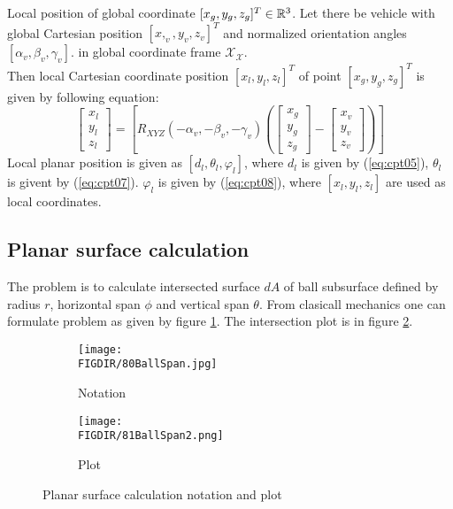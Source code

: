 \begin{definition}{Local position of global coordinate $[x_g,y_g,z_g]^T\in\mathbb{R}^3$.}\label{def:globalToLocal}
    Let there be vehicle with global Cartesian position $[x,_v,y_v,z_v]^T$ and normalized orientation angles $[\alpha_v,\beta_v,\gamma_v]$. in global coordinate frame $\mathscr{X}_\mathscr{X}$.\\
    Then local Cartesian coordinate position $[x_l,y_l,z_l]^T$ of point $[x_g,y_g,z_g]^T$ is given by following equation:
    \begin{equation}
        \begin{bmatrix}
            x_l\\y_l\\z_l
        \end{bmatrix}
        =
        \left [
            R_{XYZ}(-\alpha_v,-\beta_v,-\gamma_v)
            \left (
            \begin{bmatrix}
                x_g\\y_g\\z_g
            \end{bmatrix}
            -
            \begin{bmatrix}
                x_v\\y_v\\z_v
            \end{bmatrix}
            \right )
        \right ]
    \end{equation}
    Local planar position is given as $[d_l, \theta_l,\varphi_l]$, where $d_l$ is given by (\ref{eq:cpt05}), $\theta_l$ is givent by (\ref{eq:cpt07}). $\varphi_l$ is given by (\ref{eq:cpt08}), where $[x_l,y_l,z_l]$ are used as local coordinates.
\end{definition}

\subsection{Planar surface calculation}
\noindent The problem is to calculate intersected surface $dA$ of ball subsurface defined by radius $r$, horizontal span $\phi$ and vertical span $\theta$. From clasicall mechanics one can formulate problem as given by figure \ref{fig:80BallSpan}. The intersection plot is in figure \ref{fig:81BallSpan2}.
\begin{figure}[H]
    \centering
    \begin{subfigure}[H]{0.3\textwidth}
        \texttt{[image: \\FIGDIR/80BallSpan.jpg]}
        \caption{Notation}
        \label{fig:80BallSpan}
    \end{subfigure}
    \begin{subfigure}[H]{0.3\textwidth}
        \texttt{[image: \\FIGDIR/81BallSpan2.png]}
        \caption{Plot}
        \label{fig:81BallSpan2}
    \end{subfigure}
    \caption{Planar surface calculation notation and plot}
    \label{fig:BallSpanNOTPLOT}
\end{figure}


